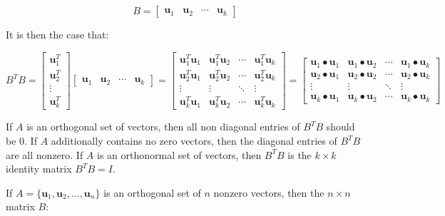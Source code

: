 \documentclass{article}
\begin{document}
\[B = \begin{bmatrix} \mathbf{u}_1 & \mathbf{u}_2 & \cdots & \mathbf{u}_k \end{bmatrix}\]

It is then the case that:

\[B^T B 
= \begin{bmatrix} \mathbf{u}_1^T \\ \mathbf{u}_2^T \\ \vdots \\ \mathbf{u}_k^T \end{bmatrix}\begin{bmatrix} \mathbf{u}_1 & \mathbf{u}_2 & \cdots & \mathbf{u}_k \end{bmatrix}
= \begin{bmatrix} \mathbf{u}_1^T \mathbf{u}_1 & \mathbf{u}_1^T \mathbf{u}_2 & \cdots & \mathbf{u}_1^T \mathbf{u}_k \\
\mathbf{u}_2^T \mathbf{u}_1 & \mathbf{u}_2^T \mathbf{u}_2 & \cdots & \mathbf{u}_2^T \mathbf{u}_k \\
\vdots & \vdots & \ddots & \vdots \\
\mathbf{u}_k^T \mathbf{u}_1 & \mathbf{u}_k^T \mathbf{u}_2 & \cdots & \mathbf{u}_k^T \mathbf{u}_k \end{bmatrix} 
= \begin{bmatrix} \mathbf{u}_1 \bullet \mathbf{u}_1 & \mathbf{u}_1 \bullet \mathbf{u}_2 & \cdots & \mathbf{u}_1 \bullet \mathbf{u}_k \\
\mathbf{u}_2 \bullet \mathbf{u}_1 & \mathbf{u}_2 \bullet \mathbf{u}_2 & \cdots & \mathbf{u}_2 \bullet \mathbf{u}_k \\
\vdots & \vdots & \ddots & \vdots \\
\mathbf{u}_k \bullet \mathbf{u}_1 & \mathbf{u}_k \bullet \mathbf{u}_2 & \cdots & \mathbf{u}_k \bullet \mathbf{u}_k \end{bmatrix} \]

If \(A\) is an orthogonal set of vectors, then all non diagonal entries of \(B^T B\) should be \(0\). If \(A\) additionally contains no zero vectors, then the diagonal entries of \(B^T B\) are all nonzero. If \(A\) is an orthonormal set of vectors, then \(B^T B\) is the \(k \times k\) identity matrix \(B^T B = I\). 


\vspace{5mm}

If \(A = \{\mathbf{u}_1, \mathbf{u}_2, ..., \mathbf{u}_n\}\) is an orthogonal set of \(n\) nonzero vectors, then the \(n \times n\) matrix \(B\): 
\end{document}
